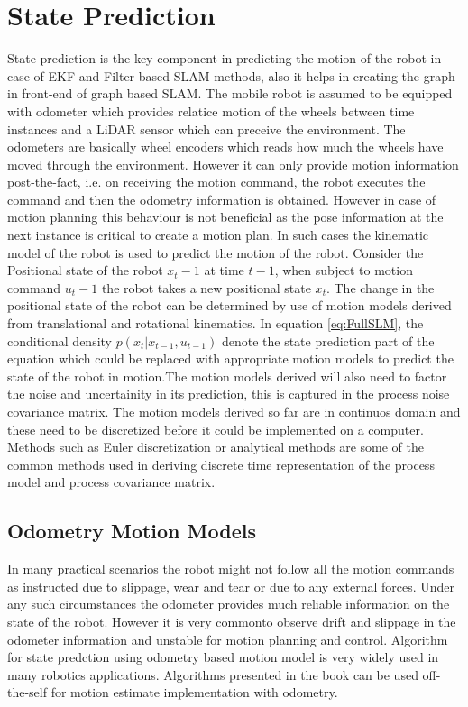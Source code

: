 \section{State Prediction}
    State prediction is the key component in predicting the motion of the robot in case of EKF and Filter based SLAM methods, also it helps in creating the graph in front-end of graph based SLAM.
The mobile robot is assumed to be equipped with odometer which provides relatice motion of the wheels between time instances and a LiDAR sensor which can preceive the environment.
The odometers are basically wheel encoders which reads how much the wheels have moved through the environment. However it can only provide motion information post-the-fact,
i.e. on receiving the motion command, the robot executes the command and then the odometry information is obtained. However 
in case of motion planning this behaviour is not beneficial as the pose information at the next instance is critical to create a motion plan. In such cases the kinematic model of the 
robot is used to predict the motion of the robot. Consider the Positional state of the robot $x_t-1$ at time $t-1$, when subject to motion command $u_t-1$ the robot takes a new 
positional state $x_t$. The change in the positional state of the robot can be determined by use of motion models derived from translational and rotational kinematics.
In equation \ref{eq:FullSLM}, the conditional density $p(x_t| x_{t-1}, u_{t-1})$ denote the state prediction part of the equation which could be replaced with appropriate motion models to predict the state of the 
robot in motion.The motion models derived will also need to factor the noise and uncertainity in its prediction, this is captured in the process noise covariance matrix. The motion models derived so far are 
in continuos domain and these need to be discretized before it could be implemented on a computer. Methods such as Euler discretization or analytical methods are some of the common methods used in deriving
discrete time representation of the process model and process covariance matrix.

\subsection{Odometry Motion Models}
In many practical scenarios the robot might not follow all the motion commands as instructed due to slippage, wear and tear or due to any external forces. Under any such circumstances the odometer 
provides much reliable information on the state of the robot. However it is very commonto observe drift and slippage in the odometer information and unstable for motion planning and control.
Algorithm for state predction using odometry based motion model is very widely used in many robotics applications. Algorithms presented in the book \cite{Thrun98aprobabilistic} can be used off-the-self 
for motion estimate implementation with odometry.

